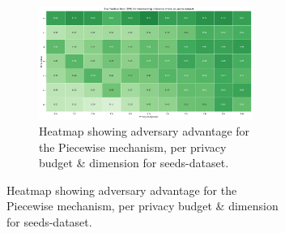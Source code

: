 \begin{figure}[H]
\begin{subfigure}[b]{0.85\textwidth}
        \begin{subfigure}[c]{1\textwidth}
            \includegraphics[width=1\textwidth]{Results/kd-laplace/piecewise/seeds-dataset/tpr.png}
            \caption{Heatmap showing adversary advantage for the Piecewise mechanism, per privacy budget \& dimension for seeds-dataset.}
            \label{fig:privacy_seeds-dataset_adversial_advantage_piecewise}
        \end{subfigure}
    \end{subfigure}
    \hfill %
    \begin{subfigure}[b]{0.075\textwidth}

\end{subfigure}
\end{figure}
